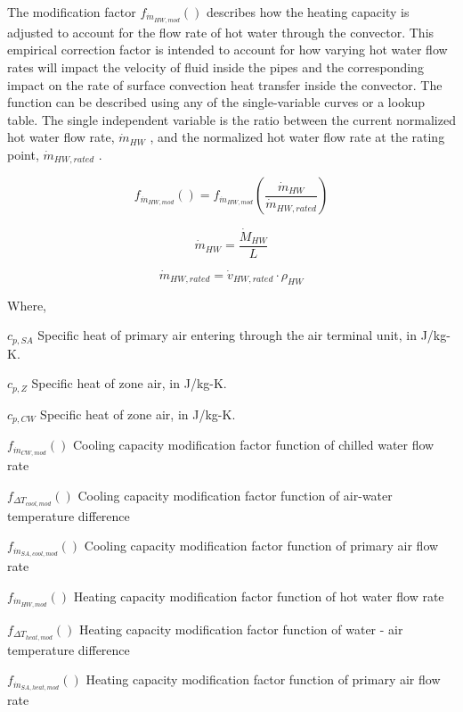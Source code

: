 The modification factor \(f_{\dot m_{HW,mod}}()\) describes how the heating capacity is adjusted to account for the flow rate of hot water through the convector. This empirical correction factor is intended to account for how varying hot water flow rates will impact the velocity of fluid inside the pipes and the corresponding impact on the rate of surface convection heat transfer inside the convector. The function can be described using any of the single-variable curves or a lookup table. The single independent variable is the ratio between the current normalized hot water flow rate, \({\dot m_{HW}}\) , and the normalized hot water flow rate at the rating point, \({\dot m_{HW,rated}}\) .

\begin{equation}
  f_{\dot m_{HW,mod}}() = f_{\dot m_{HW,mod}}\left(\frac{{\dot m_{HW}}}{{\dot m_{HW,rated}}}\right)
\end{equation}

\begin{equation}
  {\dot m_{HW}} = \frac{\dot M_{HW}}{L}
\end{equation}

\begin{equation}
  {\dot m_{HW,rated}} = {\dot v_{HW,rated}} \cdot {\rho_{HW}}
\end{equation} 

Where,

\({c_{p,SA}}\) Specific heat of primary air entering through the air terminal unit, in J/kg-K.

\({c_{p,Z}}\) Specific heat of zone air, in J/kg-K.

\({c_{p,CW}}\) Specific heat of zone air, in J/kg-K.

\({f_{\dot m_{CW,mod}}()}\) Cooling capacity modification factor function of chilled water flow rate

\({f_{ \Delta T_{cool,mod} }()}\) Cooling capacity modification factor function of air-water temperature difference

\({f_{\dot m_{SA,cool,mod}}()}\) Cooling capacity modification factor function of primary air flow rate

\({f_{\dot m_{HW,mod}}()}\) Heating capacity modification factor function of hot water flow rate

\({f_{ \Delta T_{heat,mod} }()}\) Heating capacity modification factor function of water - air temperature difference

\({f_{\dot m_{SA,heat,mod}}()}\) Heating capacity modification factor function of primary air flow rate

